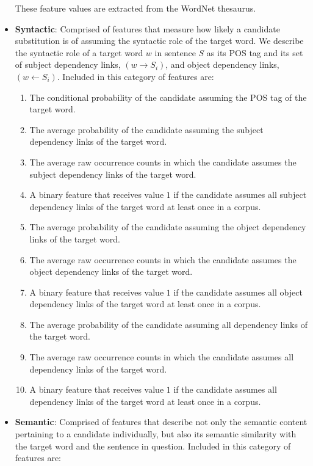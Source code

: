 \begin{itemize}
These feature values are extracted from the WordNet thesaurus.

\item \textbf{Syntactic}: Comprised of features that measure how likely a candidate substitution is of assuming the syntactic role of the target word. We describe the syntactic role of a target word $w$ in sentence $S$ as its POS tag and its set of subject dependency links, $\left ( w \rightarrow  S_{i} \right )$, and object dependency links, $\left ( w \leftarrow  S_{i} \right )$. Included in this category of features are:

\begin{enumerate}
	\item The conditional probability of the candidate assuming the POS tag of the target word.
	\item The average probability of the candidate assuming the subject dependency links of the target word.
	\item The average raw occurrence counts in which the candidate assumes the subject dependency links of the target word.
	\item A binary feature that receives value $1$ if the candidate assumes all subject dependency links of the target word at least once in a corpus.
	\item The average probability of the candidate assuming the object dependency links of the target word.
	\item The average raw occurrence counts in which the candidate assumes the object dependency links of the target word.
	\item A binary feature that receives value $1$ if the candidate assumes all object dependency links of the target word at least once in a corpus.
	\item The average probability of the candidate assuming all dependency links of the target word.
	\item The average raw occurrence counts in which the candidate assumes all dependency links of the target word.
	\item A binary feature that receives value $1$ if the candidate assumes all dependency links of the target word at least once in a corpus.
\end{enumerate}

\item \textbf{Semantic}: Comprised of features that describe not only the semantic content pertaining to a candidate individually, but also its semantic similarity with the target word and the sentence in question. Included in this category of features are:


\end{itemize}
